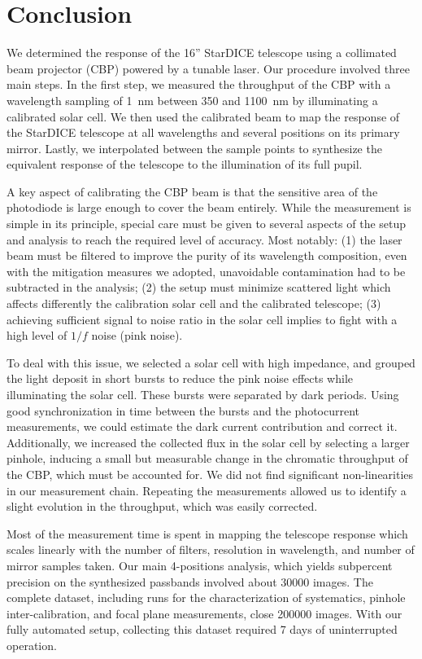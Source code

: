\section{Conclusion}
\label{sec:discussion}

We determined the response of the 16'' StarDICE telescope using a
collimated beam projector (CBP) powered by a tunable laser. Our
procedure involved three main steps. In the first step, we measured the
throughput of the CBP with a wavelength sampling of \SI{1}{nm} between
350 and \SI{1100}{nm} by illuminating a calibrated solar cell. We then
used the calibrated beam to map the response of the StarDICE telescope
at all wavelengths and several positions on its primary
mirror. Lastly, we interpolated between the sample points to
synthesize the equivalent response of the telescope to the illumination
of its full pupil.

A key aspect of calibrating the CBP beam is that the
sensitive area of the photodiode is large enough to cover the beam entirely. While the measurement is simple in its principle, special
care must be given to several aspects of the setup and analysis to
reach the required level of accuracy. Most notably: (1) the laser beam must be filtered to improve the purity of its wavelength
composition, even with the mitigation measures we adopted, unavoidable
contamination had to be subtracted in the analysis; (2) the setup must minimize scattered light which affects differently the calibration solar cell and the calibrated telescope; (3) achieving sufficient signal to noise ratio in the solar cell implies to fight with a high level of $1/f$ noise (pink noise).

To deal with this issue, we selected a solar cell with high
impedance, and grouped the light deposit in short bursts to reduce the
pink noise effects while illuminating the solar cell.
These bursts were separated by dark periods. Using good synchronization in time
between the bursts and the photocurrent measurements, 
we could estimate the dark current contribution and correct it.
Additionally, we increased the collected flux in the solar cell 
by selecting a larger pinhole, inducing a small but measurable change in the
chromatic throughput of the CBP, which must be accounted for.
We did not find significant non-linearities in our measurement
chain. Repeating the measurements allowed us to identify a slight
evolution in the throughput, which was easily corrected.

Most of the measurement time is spent in mapping the telescope
response which scales linearly with the number of filters,
resolution in wavelength, and number of mirror samples taken. Our main
4-positions analysis, which yields subpercent precision on the
synthesized passbands involved about \num{30000} images. The complete
dataset, including runs for the characterization of systematics,
pinhole inter-calibration, and focal plane measurements, close \num{200000}
images. With our fully automated setup, collecting this dataset required
7 days of uninterrupted operation. 

